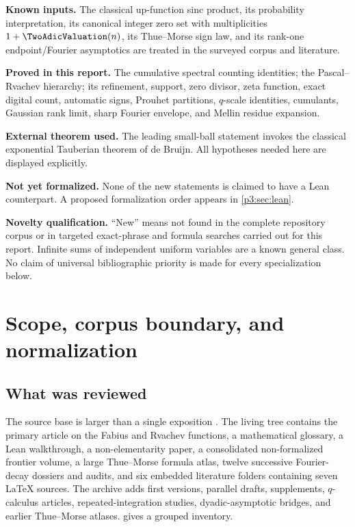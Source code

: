 \documentclass[11pt,oneside]{article}
\theoremstyle{definition}
\theoremstyle{remark}
\begin{document}
\begin{statusbox}
\textbf{Known inputs.}  The classical up-function sinc product, its probability interpretation, its canonical integer zero set with multiplicities $1+\TwoAdicValuation(n)$, its Thue--Morse sign law, and its rank-one endpoint/Fourier asymptotics are treated in the surveyed corpus and literature.

\textbf{Proved in this report.}  The cumulative spectral counting identities; the Pascal--Rvachev hierarchy; its refinement, support, zero divisor, zeta function, exact digital count, automatic signs, Prouhet partitions, $q$-scale identities, cumulants, Gaussian rank limit, sharp Fourier envelope, and Mellin residue expansion.

\textbf{External theorem used.}  The leading small-ball statement invokes the classical exponential Tauberian theorem of de Bruijn.  All hypotheses needed here are displayed explicitly.

\textbf{Not yet formalized.}  None of the new statements is claimed to have a Lean counterpart.  A proposed formalization order appears in \cref{p3:sec:lean}.

\textbf{Novelty qualification.}  ``New'' means not found in the complete repository corpus or in targeted exact-phrase and formula searches carried out for this report.  Infinite sums of independent uniform variables are a known general class.  No claim of universal bibliographic priority is made for every specialization below.
\end{statusbox}

\clearpage

\clearpage

\section{Scope, corpus boundary, and normalization}\label{p3:sec:scope}

\subsection{What was reviewed}

The source base is larger than a single exposition \cite{p3:repo-docs}.  The living tree contains the primary article on the Fabius and Rvachev functions, a mathematical glossary, a Lean walkthrough, a non-elementarity paper, a consolidated non-formalized frontier volume, a large Thue--Morse formula atlas, twelve successive Fourier-decay dossiers and audits, and six embedded literature folders containing seven LaTeX sources.  The archive adds first versions, parallel drafts, supplements, $q$-calculus articles, repeated-integration studies, dyadic-asymptotic bridges, and earlier Thue--Morse atlases.   gives a grouped inventory.
\end{document}
